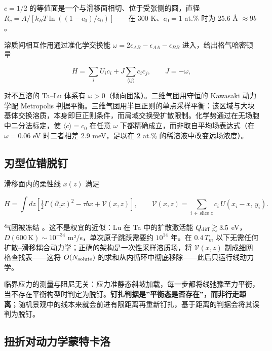 \(c = 1/2\) 的等值面是一个与滑移面相切、位于受张侧的圆，直径 \(R_c = A/[k_BT\ln((1-c_0)/c_0)]\)------在 300 K、\(c_0 = 1\) at.\% 时为 25.6 Å \(\approx 9b\)。

溶质间相互作用通过准化学交换能 \cite{guggenheim1952} \(\omega = 2\epsilon_{AB} - \epsilon_{AA} - \epsilon_{BB}\) 进入，给出格气哈密顿量

\[H = \sum_i U_i c_i + J\sum_{\langle ij\rangle} c_i c_j,\qquad J = -\omega,\]

对不互溶的 Ta--Lu 体系有 \(\omega > 0\)（倾向团簇）。二维气团用守恒的 Kawasaki 动力学配 Metropolis 判据平衡。三维气团用半巨正则的单点采样平衡：该区域与大块基体交换溶质，本身即巨正则条件，而局域交换受扩散限制。化学势通过在无场胞中二分法标定，使 \(\langle c\rangle = c_0\) 在任意 \(\omega\) 下都精确成立，而非取自平均场表达式（在 \(\omega = 0.06\) eV 时二者相差 2.9 meV，足以在 2 at.\% 的稀溶液中改变远场浓度）。

\hypertarget{ux5203ux578bux4f4dux9519ux8131ux9489}{%
\subsection{刃型位错脱钉}\label{sec:ux5203ux578bux4f4dux9519ux8131ux9489}}

滑移面内的柔性线 \(x(z)\) 满足

\[H = \int\!dz\left[\tfrac12\Gamma(\partial_z x)^2 - \tau b x + \mathcal{V}(x,z)\right],\qquad \mathcal{V}(x,z) = \sum_{i\,\in\,\text{slice }z} c_i\,U(x_i - x,\,y_i).\]

气团被冻结 \cite{cottrell1949}。这不是权宜的近似：Lu 在 Ta 中的扩散激活能 \(Q_{\rm diff}\gtrsim3.5\) eV，\(D(600\,\mathrm{K})\sim10^{-34}\) m²/s，单次原子跳跃需要约 \(10^{14}\) 年。在 \(0.4\,T_m\) 以下无需任何扩散--滑移耦合动力学；正确的架构是一次性采样溶质场，将 \(\mathcal{V}(x,z)\) 制成细网格查找表------这将 \(O(N_{\rm solute})\) 的求和从内循环中彻底移除------此后只运行线动力学。

临界应力的测量与阻尼无关：应力准静态斜坡加载，每一步都将线弛豫至力平衡，当不存在平衡构型时判定为脱钉。\textbf{钉扎判据是''平衡态是否存在''，而非行走距离}；随机景观中的线本来就会前进有限距离再重新钉扎，基于距离的判据会将其误判为脱钉。

\hypertarget{ux626dux6298ux5bf9ux52a8ux529bux5b66ux8499ux7279ux5361ux6d1b}{%
\subsection{扭折对动力学蒙特卡洛}\label{sec:ux626dux6298ux5bf9ux52a8ux529bux5b66ux8499ux7279ux5361ux6d1b}}

